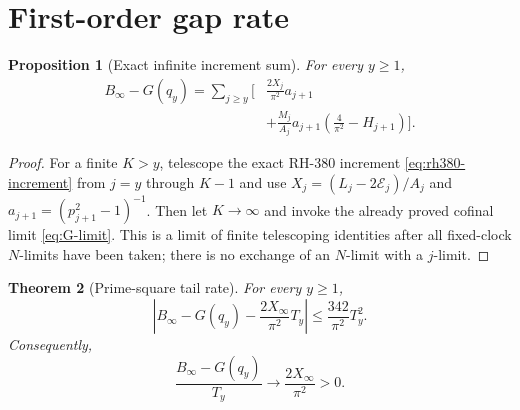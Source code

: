 \documentclass[11pt]{article}
\newtheorem{theorem}{Theorem}[section]
\newtheorem{proposition}[theorem]{Proposition}
\theoremstyle{definition}
\theoremstyle{remark}
\newcommand{\Ecal}{\mathcal E}
\begin{document}
\section{First-order gap rate}

\begin{proposition}[Exact infinite increment sum]
\label{prop:infinite-sum}
For every $y\ge1$,
\begin{equation}
\begin{aligned}
B_\infty-G(q_y)
=\sum_{j\ge y}\biggl[
 &\frac{2X_j}{\pi^2}a_{j+1}\\
 &+\frac{M_j}{A_j}a_{j+1}
 \left(\frac4{\pi^2}-H_{j+1}\right)
\biggr].
\end{aligned}
\label{eq:infinite-sum}
\end{equation}
\end{proposition}

\begin{proof}
For a finite $K>y$, telescope the exact RH-380 increment
\eqref{eq:rh380-increment} from $j=y$ through $K-1$ and use
$X_j=(L_j-2\Ecal_j)/A_j$ and
$a_{j+1}=(p_{j+1}^2-1)^{-1}$.  Then let $K\to\infty$ and invoke the
already proved cofinal limit \eqref{eq:G-limit}.  This is a limit of finite
telescoping identities after all fixed-clock $N$-limits have been taken;
there is no exchange of an $N$-limit with a $j$-limit.
\end{proof}

\begin{theorem}[Prime-square tail rate]
\label{thm:rate}
For every $y\ge1$,
\begin{equation}
 \boxed{
 \left|B_\infty-G(q_y)-\frac{2X_\infty}{\pi^2}T_y\right|
 \le\frac{342}{\pi^2}T_y^2.}
 \label{eq:rate-bound}
\end{equation}
Consequently,
\begin{equation}
 \boxed{
 \frac{B_\infty-G(q_y)}{T_y}
 \longrightarrow\frac{2X_\infty}{\pi^2}>0.}
 \label{eq:ratio-limit}
\end{equation}
\end{theorem}
\end{document}
